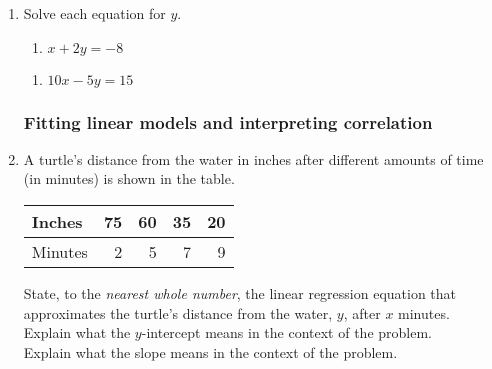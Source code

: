 \documentclass[12pt, oneside]{article}
\begin{document}
\begin{enumerate}
  \item Solve each equation for $y$.
  \begin{multicols}{2}
    \raggedcolumns
    \begin{enumerate}
      \item $x+2y=-8$\\[0.5cm]
    \end{enumerate}
    \begin{enumerate}
      \item $10x-5y=15$ \\[0.5cm]
    \end{enumerate}
  \end{multicols}

  \newpage


\subsubsection*{Fitting linear models and interpreting correlation}
\item A turtle's distance from the water in inches after different amounts of time (in minutes) is shown in the table.
  \renewcommand{\arraystretch}{1.6}
    \begin{center}
      \begin{tabular}{|l|r|r|r|r|}
      \hline
      Inches & 75 & 60 & 35 & 20 \\
      \hline
      Minutes  & 2 & 5 & 7 & 9 \\
      \hline
      \end{tabular}
    \end{center}

    \begin{center} %
    \end{center}

    State, to the \emph{nearest whole number}, the linear regression equation that approximates the turtle's distance from the water, $y$, after $x$ minutes.\\[2cm]
    Explain what the $y$-intercept means in the context of the problem. \\[3cm]
    Explain what the slope means in the context of the problem.


\end{enumerate}
\end{document}

